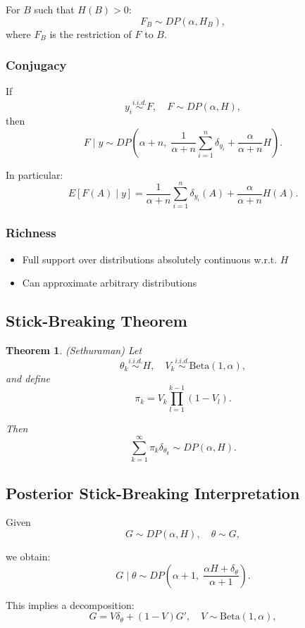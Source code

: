\documentclass[12pt,oneside]{book}
\numberwithin{equation}{section}
\theoremstyle{definition}
\theoremstyle{plain}
\newtheorem{theorem}{Theorem}[section]
\theoremstyle{remark}
\begin{document}
For $B$ such that $H(B)>0$:
\[
F_B \sim DP(\alpha, H_B),
\]
where $F_B$ is the restriction of $F$ to $B$.

\subsubsection*{Conjugacy}

If
\[
y_i \overset{i.i.d.}{\sim} F, \quad F \sim DP(\alpha, H),
\]
then
\[
F \mid y \sim DP\left(\alpha + n,\; \frac{1}{\alpha+n}\sum_{i=1}^n \delta_{y_i} + \frac{\alpha}{\alpha+n} H \right).
\]

In particular:
\[
E[F(A)\mid y] =
\frac{1}{\alpha+n}\sum_{i=1}^n \delta_{y_i}(A)
+
\frac{\alpha}{\alpha+n} H(A).
\]

\subsubsection*{Richness}

\begin{itemize}
\item Full support over distributions absolutely continuous w.r.t. $H$
\item Can approximate arbitrary distributions
\end{itemize}

\subsection*{Stick-Breaking Theorem}

\begin{theorem}(Sethuraman)
Let
\[
\theta_k \overset{i.i.d.}{\sim} H, \quad V_k \overset{i.i.d.}{\sim} \mathrm{Beta}(1,\alpha),
\]
and define
\[
\pi_k = V_k \prod_{l=1}^{k-1} (1 - V_l).
\]

Then
\[
\sum_{k=1}^{\infty} \pi_k \delta_{\theta_k} \sim DP(\alpha, H).
\]
\end{theorem}

\subsection*{Posterior Stick-Breaking Interpretation}

Given
\[
G \sim DP(\alpha,H), \quad \theta \sim G,
\]

we obtain:
\[
G \mid \theta \sim DP\left(\alpha+1,\; \frac{\alpha H + \delta_\theta}{\alpha+1}\right).
\]

This implies a decomposition:
\[
G = V \delta_\theta + (1-V) G',
\quad
V \sim \mathrm{Beta}(1,\alpha),
\]
\end{document}
